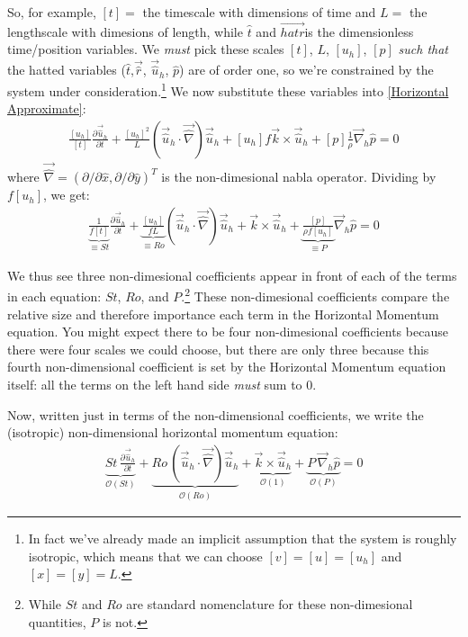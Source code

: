 So, for example, $[t]= $ the timescale with dimensions of time and $L= $ the lengthscale with dimesions of length, while $\hat{t}$ and $\vec{hat{r}}$is the dimensionless time/position variables. We \textit{must} pick these scales $[t]$, $L$, $[u_h]$, $[p]$ \textit{such that} the hatted variables ($\hat{t}$,$\vec{\hat{r}}$, $\vec{\hat{u}}_h$, $\hat{p}$) are of order one, so we're constrained by the system under consideration.\footnote{
    In fact we've already made an implicit assumption that the system is roughly isotropic, which means that we can choose $[v]=[u]=[u_h]$ and $[x]=[y]=L$.  
} We now substitute these variables into \ref{Horizontal Approximate}:
\begin{align*}
    \frac{[u_h]}{[t]}\frac{\partial\vec{\hat{u}}_h}{\partial t}+\frac{[u_h]^2}{L}\left( \vec{\hat{u}}_h\cdot\vec{\hat{\nabla}} \right)\vec{\hat{u}}_h+[u_h]f\vec{k}\times\vec{\hat{u}}_h+[p]\frac{1}{\rho}\vec{\nabla}_h\hat{p}=0
\end{align*}
where $\vec{\hat{\nabla}}=(\partial/\partial \hat{x},\partial/\partial \hat{y})^T$ is the non-dimesional nabla operator. Dividing by $f[u_h]$, we get:
\begin{align*}
    \underbrace{\boxed{\frac{1}{f[t]}}}_{\equiv St}\frac{\partial\vec{\hat{u}}_h}{\partial t}+\underbrace{\boxed{\frac{[u_h]}{fL}}}_{\equiv Ro}\left( \vec{\hat{u}}_h\cdot\vec{\hat{\nabla}} \right)\vec{\hat{u}}_h+\vec{k}\times\vec{\hat{u}}_h+\underbrace{\boxed{\frac{[p]}{\rho f [u_h]}}}_{\equiv P}\vec{\nabla}_h\hat{p}=0
\end{align*}

We thus see three non-dimesional coefficients appear in front of each of the terms in each equation: $St$, $Ro$, and $P$.\footnote{
    While $St$ and $Ro$ are standard nomenclature for these non-dimesional quantities, $P$ is not.
} These non-dimesional coefficients compare the relative size and therefore importance each term in the Horizontal Momentum equation. You might expect there to be four non-dimesional coefficients because there were four scales we could choose, but there are only three because this fourth non-dimensional coefficient is set by the Horizontal Momentum equation itself: all the terms on the left hand side \textit{must} sum to $0$.

Now, written just in terms of the non-dimensional coefficients, we write the (isotropic) non-dimensional horizontal momentum equation:
\begin{align}
    \label{Horizontal Approximate nondim}
    \underbrace{St\,\frac{\partial\vec{\hat{u}}_h}{\partial t}}_{\mathcal{O}(St)}+
    \underbrace{Ro\,\left( \vec{\hat{u}}_h\cdot\vec{\hat{\nabla}} \right)\vec{\hat{u}}_h}_{\mathcal{O}(Ro)}+
    \underbrace{\vec{k}\times\vec{\hat{u}}_h}_{\mathcal{O}(1)}+
    \underbrace{P\,\vec{\nabla}_h\hat{p}}_{\mathcal{O}(P)}=0
\end{align}

